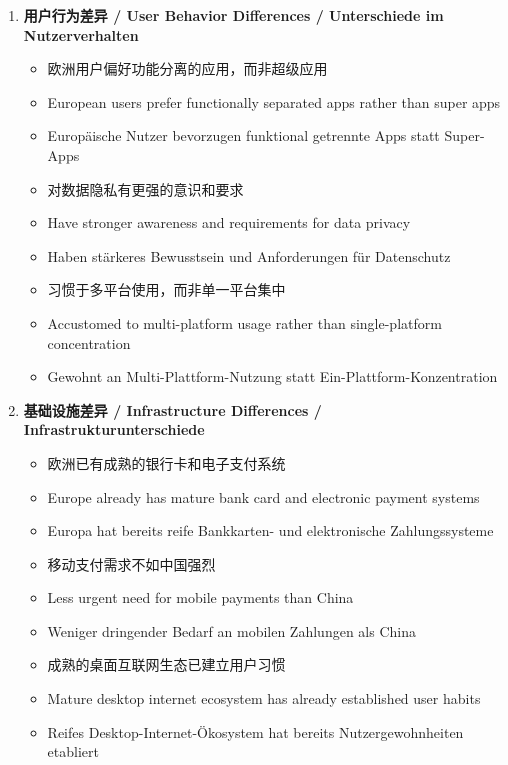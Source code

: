 \documentclass[11pt,a4paper]{article}
\begin{document}
\begin{enumerate}
    \item \textbf{用户行为差异 / User Behavior Differences / Unterschiede im Nutzerverhalten}
    \begin{itemize}
        \item 欧洲用户偏好功能分离的应用，而非超级应用
        \item European users prefer functionally separated apps rather than super apps
        \item Europäische Nutzer bevorzugen funktional getrennte Apps statt Super-Apps
        \item 对数据隐私有更强的意识和要求
        \item Have stronger awareness and requirements for data privacy
        \item Haben stärkeres Bewusstsein und Anforderungen für Datenschutz
        \item 习惯于多平台使用，而非单一平台集中
        \item Accustomed to multi-platform usage rather than single-platform concentration
        \item Gewohnt an Multi-Plattform-Nutzung statt Ein-Plattform-Konzentration
    \end{itemize}
    
    \item \textbf{基础设施差异 / Infrastructure Differences / Infrastrukturunterschiede}
    \begin{itemize}
        \item 欧洲已有成熟的银行卡和电子支付系统
        \item Europe already has mature bank card and electronic payment systems
        \item Europa hat bereits reife Bankkarten- und elektronische Zahlungssysteme
        \item 移动支付需求不如中国强烈
        \item Less urgent need for mobile payments than China
        \item Weniger dringender Bedarf an mobilen Zahlungen als China
        \item 成熟的桌面互联网生态已建立用户习惯
        \item Mature desktop internet ecosystem has already established user habits
        \item Reifes Desktop-Internet-Ökosystem hat bereits Nutzergewohnheiten etabliert
    \end{itemize}
    

\end{enumerate}
\end{document}
